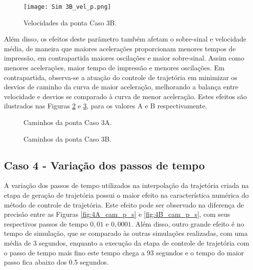 \begin{figure}[H]
    \centering
    \caption{Velocidades da ponta Caso 3B.}
    \texttt{[image: Sim 3B\_vel\_p.png]}

    \label{fig:3B_vel_p}
\end{figure}

Além disso, os efeitos deste parâmetro também afetam o sobre-sinal e velocidade média, de maneira que maiores acelerações proporcionam menores tempos de impressão, em contrapartida maiores oscilações e maior sobre-sinal. Assim como menores acelerações, maior tempo de impressão e menores oscilações. Em contrapartida, observa-se a atuação do controle de trajetória em minimizar os desvios de caminho da curva de maior aceleração, melhorando a balança entre velocidade e desvios se comparado à curva de menor aceleração. Estes efeitos são ilustrados nas Figuras \ref{fig:3A_cam_p_s} e \ref{fig:3B_cam_p_s}, para os valores A e B respectivamente.

\begin{figure}[H]
    \centering
    \hfill
    \caption{Caminhos da ponta Caso 3A.}
    \label{fig:3A_cam_p_s}
\end{figure}

\begin{figure}[H]
    \centering
    \hfill
    \caption{Caminhos da ponta Caso 3B.}
    \label{fig:3B_cam_p_s}
\end{figure}

\subsection{Caso 4 - Variação dos passos de tempo}
A variação dos passos de tempo utilizados na interpolação da trajetória criada na etapa de geração de trajetória possui o maior efeito na característica numérica do método de controle de trajetória. Este efeito pode ser observado na diferença de precisão entre as Figuras \ref{fig:4A_cam_p_s} e \ref{fig:4B_cam_p_s}, com seus respectivos passos de tempo \(0,01\) e \(0,0001\). Além disso, outro grande efeito é no tempo de simulação, que se comparado às outras simulações realizadas, com uma média de 3 segundos, enquanto a execução da etapa de controle de trajetória com o passo de tempo mais fino este tempo chega a 93 segundos e o tempo do maior passo fica abaixo dos 0.5 segundos.

